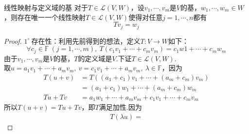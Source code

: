 \documentclass[lang=cn, zihao=5]{elegantbook}
\newcommand{\F}{\mathbb{F}}
\newcommand{\lmap}{\mathcal{L}}
\newcommand{\buzhou}[1]{$#1^{\circ} \ $}
\begin{document}
\begin{proposition}{线性映射与定义域的基}
	对于$T \in \lmap (V,W)$，设$v_1, \cdots ,v_m$是$V$的基，$w_1, \cdots ,w_m \in W$，则存在唯一一个线性映射$T \in \lmap (V,W)$使得对任意$j=1, \cdots ,n$都有$$Tv_j = w_j$$
\end{proposition}
\begin{proof}
	\buzhou{1}存在性：利用先前得到的想法，定义$T:V \to W$如下：$$\forall c_j \in \F~(j=1, \cdots,m),~T(c_1v_1 + \cdots + c_mv_m) = c_1w1 + \cdots + c_mw_m$$
	由于$v_1, \cdots ,v_m$是$V$的基，$T$的定义域是$V$.下证$T \in \lmap (V,W)$. \\
	取$u=a_1v_1 + \cdots + a_mv_m,~v=c_1v_1 + \cdots + a_mv_m,~ \lambda \in \F$，因为
	\begin{align*}
		T(u+v) &= T((a_1+c_1)v_1 + \cdots + (a_m+c_m)v_m) \\
		&= (a_1+c_1)w_1 + \cdots + (a_m+c_m)w_m \\
		Tu+Tv &= a_1w_1 + \cdots + a_mv_m + c_1v_1 + \cdots + c_mv_m
	\end{align*}
	所以$T(u+v)=Tu+Tv$，即$T$满足加性.因为
	\begin{align*}
		T(\lambda u) = 
	\end{align*}
\end{proof}
\end{document}

